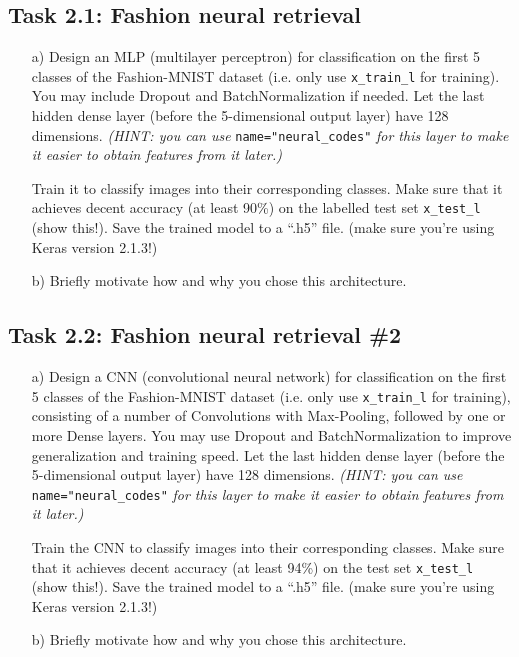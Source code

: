 \documentclass[a4paper,twoside,10pt]{article}
\begin{document}
\subsection*{Task 2.1: Fashion neural retrieval}
\begin{itemize}
  \item[a)] Design an MLP (multilayer perceptron) for classification on the first 5 classes of the Fashion-MNIST dataset (i.e. only use \texttt{x\_train\_l} for training). You may include Dropout and BatchNormalization if needed. Let the last hidden dense layer (before the 5-dimensional output layer) have 128 dimensions. \emph{(HINT: you can use} \texttt{name="neural\_codes"} \emph{for this layer to make it easier to obtain features from it later.)}

Train it to classify images into their corresponding classes. Make sure that it achieves decent accuracy (at least 90\%) on the labelled test set \texttt{x\_test\_l} (show this!). Save the trained model to a ``.h5'' file. (make sure you're using Keras version 2.1.3!)
  \item[b)] Briefly motivate how and why you chose this architecture.
\end{itemize}

\subsection*{Task 2.2: Fashion neural retrieval \#2}
\begin{itemize}
  \item[a)] Design a CNN (convolutional neural network) for classification on the first 5 classes of the Fashion-MNIST dataset (i.e. only use \texttt{x\_train\_l} for training), consisting of a number of Convolutions with Max-Pooling, followed by one or more Dense layers. You may use Dropout and BatchNormalization to improve generalization and training speed. Let the last hidden dense layer (before the 5-dimensional output layer) have 128 dimensions. \emph{(HINT: you can use} \texttt{name="neural\_codes"} \emph{for this layer to make it easier to obtain features from it later.)}

Train the CNN to classify images into their corresponding classes. Make sure that it achieves decent accuracy (at least 94\%) on the test set \texttt{x\_test\_l} (show this!). Save the trained model to a ``.h5'' file. (make sure you're using Keras version 2.1.3!)
  \item[b)] Briefly motivate how and why you chose this architecture.
\end{itemize}
\end{document}
